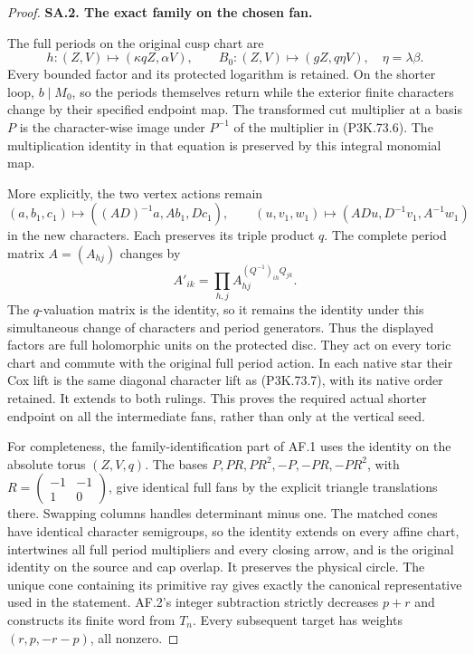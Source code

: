 \begin{proof}
\par\medskip\noindent\textbf{SA.2. The exact family on the chosen fan.}\par\nopagebreak[4]
The full periods on the original cusp chart are
\[
 h:(Z,V)\mapsto(\kappa q Z,\alpha V),\qquad
 B_0:(Z,V)\mapsto(gZ,q\eta V),\quad \eta=\lambda\beta.
 \tag{P3K.73.10}
\]
Every bounded factor and its protected logarithm is retained.
On the shorter loop, \(b\mid M_0\), so the periods themselves
return while the exterior finite characters change by their
specified endpoint map. The transformed cut multiplier at a
basis \(P\) is the character-wise image under \(P^{-1}\) of
the multiplier in (P3K.73.6). The multiplication identity in
that equation is preserved by this integral monomial map.

More explicitly, the two vertex actions remain
\[
 (a,b_1,c_1)\mapsto((AD)^{-1}a,Ab_1,Dc_1),\qquad
 (u,v_1,w_1)\mapsto(ADu,D^{-1}v_1,A^{-1}w_1)
 \tag{P3K.73.11}
\]
in the new characters. Each preserves its triple product \(q\).
The complete period matrix \(A=(A_{hj})\) changes by
\[
 A'_{ik}=\prod_{h,j}A_{hj}^{(Q^{-1})_{ih}Q_{jk}}.
 \tag{P3K.73.12}
\]
The \(q\)-valuation matrix is the identity, so it remains the
identity under this simultaneous change of characters and
period generators. Thus the displayed factors are full
holomorphic units on the protected disc. They act on every
toric chart and commute with the original full period action.
In each native star their Cox lift is the same diagonal
character lift as (P3K.73.7), with its native order retained.
It extends to both rulings. This proves the required actual
shorter endpoint on all the intermediate fans, rather than
only at the vertical seed.

For completeness, the family-identification part of AF.1 uses
the identity on the absolute torus \((Z,V,q)\). The bases
\(P,PR,PR^2,-P,-PR,-PR^2\), with
\(R=\left(\begin{smallmatrix}-1&-1\\1&0\end{smallmatrix}\right)\),
give identical full fans by the explicit triangle translations
there. Swapping columns handles determinant minus one. The
matched cones have identical character semigroups, so the
identity extends on every affine chart, intertwines all full
period multipliers and every closing arrow, and is the original
identity on the source and cap overlap. It preserves the
physical circle. The unique cone containing its primitive ray
gives exactly the canonical representative used in the statement.
AF.2's integer subtraction strictly decreases \(p+r\) and
constructs its finite word from \(T_n\). Every subsequent
target has weights \((r,p,-r-p)\), all nonzero.


\end{proof}
